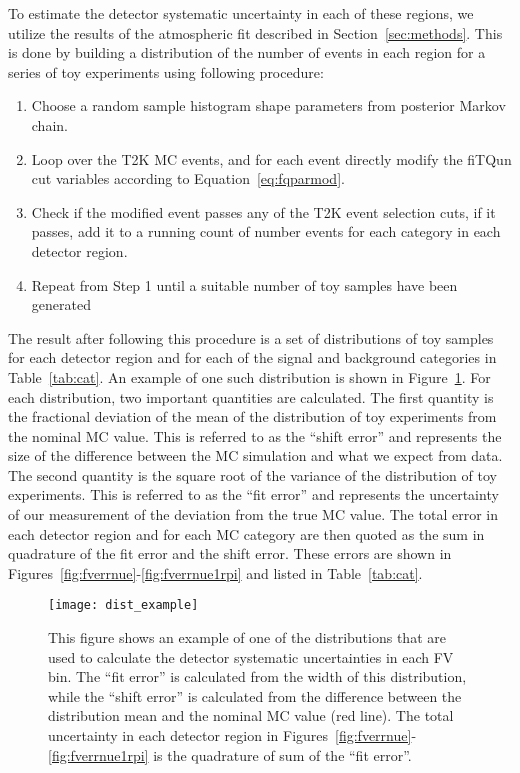To estimate the detector systematic uncertainty in each of these regions, we
utilize the results of the atmospheric fit described in
Section~\ref{sec:methods}. This is done by building a distribution of the
number of events in each region for a series of toy experiments using following
procedure:

\begin{enumerate}
  \item Choose a random sample histogram shape parameters from posterior Markov chain.
  \item Loop over the T2K MC events, and for each event directly modify the fiTQun cut variables
    according to Equation~\ref{eq:fqparmod}.
  \item Check if the modified event passes any of the T2K event selection cuts,
    if it passes, add it to a running
    count of number events for each category in each detector region.
  \item Repeat from Step 1 until a suitable number of toy samples have been generated
\end{enumerate}

The result after following this procedure is a set of distributions of toy
samples for each detector region and for each of the signal and background
categories in Table~\ref{tab:cat}.  An example of one such distribution is
shown in Figure~\ref{fig:fverrsinglebin}.  For each distribution, two important
quantities are calculated.  The first quantity is the fractional deviation of
the mean of the distribution of toy experiments from the nominal MC value.
This is referred to as the ``shift error'' and represents the size of the
difference between the MC simulation and what we expect from data.  The second
quantity is the square root of the variance of the distribution of toy
experiments.  This is referred to as the ``fit error'' and represents the
uncertainty of our measurement of the deviation from the true MC
value.  The total error in each detector region and for each MC category are
then quoted as the sum in quadrature of the fit error and
the shift error.  These errors are shown in Figures~\ref{fig:fverrnue}-\ref{fig:fverrnue1rpi}
and listed in Table~\ref{tab:cat}.

\begin{figure}[h]
  \begin{center}
    \texttt{[image: dist\_example]}
  \end{center}
  \caption{This figure shows an example of one of the distributions that are
  used to calculate the detector systematic uncertainties in each FV bin.  The
  ``fit error'' is calculated from the width of this distribution, while the
  ``shift error'' is calculated from the difference between the distribution
  mean and the nominal MC value (red line).  The total uncertainty in each
  detector region in Figures~\ref{fig:fverrnue}-\ref{fig:fverrnue1rpi} is the
  quadrature of sum of the ``fit error''.}
  \label{fig:fverrsinglebin}
\end{figure}

